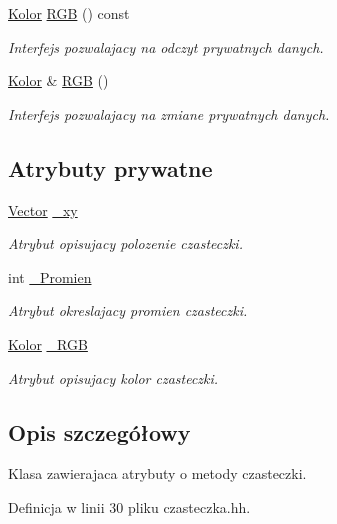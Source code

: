 \begin{DoxyCompactItemize}
\hyperlink{class_kolor}{Kolor} \hyperlink{class_czasteczka_a546104013fe302440214f8809d7ec602}{R\-G\-B} () const 
\begin{DoxyCompactList}\small\item\em Interfejs pozwalajacy na odczyt prywatnych danych. \end{DoxyCompactList}\item 
\hyperlink{class_kolor}{Kolor} \& \hyperlink{class_czasteczka_aa70b19b0f59c5e4b244a9ff203d6de41}{R\-G\-B} ()
\begin{DoxyCompactList}\small\item\em Interfejs pozwalajacy na zmiane prywatnych danych. \end{DoxyCompactList}\end{DoxyCompactItemize}
\subsection*{Atrybuty prywatne}
\begin{DoxyCompactItemize}
\item 
\hyperlink{class_vector}{Vector} \hyperlink{class_czasteczka_a025a3ee895f8ee9c765814cfca1fd5e1}{\-\_\-xy}
\begin{DoxyCompactList}\small\item\em Atrybut opisujacy polozenie czasteczki. \end{DoxyCompactList}\item 
int \hyperlink{class_czasteczka_a5a1d126d89bd571c79a5691c45e2f469}{\-\_\-\-Promien}
\begin{DoxyCompactList}\small\item\em Atrybut okreslajacy promien czasteczki. \end{DoxyCompactList}\item 
\hyperlink{class_kolor}{Kolor} \hyperlink{class_czasteczka_ab9c93cfb3cf0360579ad0def2a94178c}{\-\_\-\-R\-G\-B}
\begin{DoxyCompactList}\small\item\em Atrybut opisujacy kolor czasteczki. \end{DoxyCompactList}\end{DoxyCompactItemize}


\subsection{Opis szczegółowy}
Klasa zawierajaca atrybuty o metody czasteczki. 

Definicja w linii 30 pliku czasteczka.\-hh.



